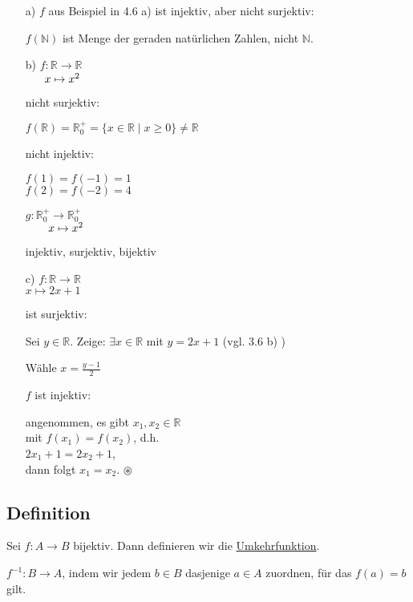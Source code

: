 \documentclass[a4paper, 12pt, twoside] {article}
\begin{document}
\begin{itemize}
\item[a)] $f$ aus Beispiel in 4.6 a) ist injektiv, aber nicht surjektiv:

$f(\mathbb{N})$ ist Menge der geraden natürlichen Zahlen, nicht $\mathbb{N}$.

\item[b)] $f \colon \mathbb{R} \rightarrow \mathbb{R}$ \\
$\text{\space\quad\space} x \mapsto x^2$

nicht surjektiv:

$f(\mathbb{R}) = \mathbb{R}^+_0 = \{x \in \mathbb{R} \mid x \geq 0 \} \neq \mathbb{R}$

nicht injektiv:

$f(1) = f(-1) = 1$ \\
$f(2) = f(-2) = 4$

\hfill

$g \colon \mathbb{R}^+_0 \rightarrow \mathbb{R}^+_0$ \\
$\text{\qquad} x \mapsto x^2$

injektiv, surjektiv, bijektiv

\item[c)] $f \colon \mathbb{R} \rightarrow \mathbb{R}$ \\
	$x \mapsto 2x+1$
	
	ist surjektiv:
	
	Sei $y \in \mathbb{R}$. Zeige: $\exists x \in \mathbb{R}$ mit $y = 2x+1$ (vgl. 3.6 b) )
	
	Wähle $x = \frac{y-1}{2}$
	
	$f$ ist injektiv:
	
	angenommen, es gibt $x_1,x_2 \in \mathbb{R}$ \\
	mit $f(x_1) = f(x_2)$, d.h. \\
	$2x_1+1 = 2x_2+1$, \\
	dann folgt $x_1 = x_2$. \qquad $\circledast$	
\end{itemize}


\subsection{Definition}
Sei $f \colon A \rightarrow B$ bijektiv. Dann definieren wir die \underline{Umkehrfunktion}.

$f^{-1} \colon B \rightarrow A$, indem wir jedem $b \in B$ dasjenige $a \in A$ zuordnen, für das $f(a) = b$ gilt.
\end{document}
